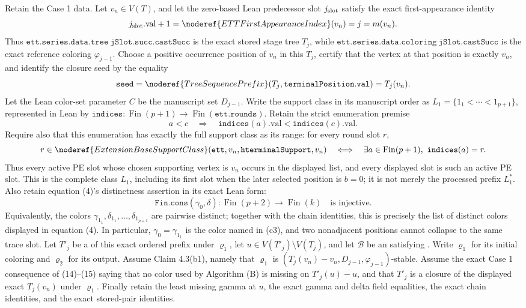 \begin{lemma}
Retain the Case 1 data.  Let \(v_n\in V(T)\), and let the zero-based Lean
predecessor slot \(j_{\rm slot}\) satisfy the exact first-appearance identity
\[
 j_{\rm slot}.\mathrm{val}+1
   =\noderef{ETTFirstAppearanceIndex}(v_n)=j=m(v_n).
\]
Thus
\(\mathtt{ett.series.data.tree\ jSlot.succ.castSucc}\) is the exact stored
stage tree \(T_j\), while
\(\mathtt{ett.series.data.coloring\ jSlot.castSucc}\) is the exact reference
coloring \(\varphi_{j-1}\).  Choose a positive occurrence position of \(v_n\)
in this \(T_j\), certify that the vertex at that position is exactly \(v_n\),
and identify the closure seed by the equality
\[
\mathtt{seed}
   =\noderef{TreeSequencePrefix}(T_j,\mathtt{terminalPosition.val})
   =T_j(v_n).
\]
Let the Lean color-set parameter \(C\) be the manuscript set \(D_{j-1}\).
Write the support class in its manuscript order as
\(L_1=\{1_1<\cdots<1_{p+1}\}\), represented in Lean by
\(\mathtt{indices}:\operatorname{Fin}(p+1)\to\operatorname{Fin}(\mathtt{ett.rounds})\).
Retain the strict enumeration premise
\[
 a<c\quad\Longrightarrow\quad
 \mathtt{indices}(a).\mathrm{val}<\mathtt{indices}(c).\mathrm{val}.
\]
Require also that this enumeration has exactly the full support class as its
range: for every round slot \(r\),
\[
 r\in\noderef{ExtensionBaseSupportClass}
       (\mathtt{ett},v_n,\mathtt{hterminalSupport},v_n)
 \quad\Longleftrightarrow\quad
 \exists a\in\operatorname{Fin}(p+1),\ \mathtt{indices}(a)=r.
\]
Thus every active PE slot whose chosen supporting vertex is \(v_n\) occurs in
the displayed list, and every displayed slot is such an active PE slot.  This
is the complete class \(L_1\), including its first slot when the later selected
position is \(b=0\); it is not merely the processed prefix \(L_1^*\).
Also retain equation (4)'s distinctness assertion in its exact Lean form:
\[
 \mathtt{Fin.cons}(\gamma_0,\delta):
   \operatorname{Fin}(p+2)\longrightarrow\operatorname{Fin}(k)
 \quad\text{is injective}.
\]
Equivalently, the colors
\(\gamma_{1_1},\delta_{1_1},\ldots,\delta_{1_{p+1}}\) are pairwise
distinct; together with the chain identities, this is precisely the list
of distinct colors displayed in equation (4).  In particular,
\(\gamma_0=\gamma_{1_1}\) is the color named in (c3), and two nonadjacent
positions cannot collapse to the same trace slot.
Let \(T'_j\) be a  of this exact ordered prefix under
\(\varrho_1\), let \(u\in V(T'_j)\setminus V(T_j)\), and let
\(\mathcal B\) be an
 satisfying
.  Write \(\varrho_1\) for
its initial coloring and \(\varrho_2\) for its output.  Assume Claim
4.3(b1), namely that \(\varrho_1\) is
\((T_j(v_n)-v_n,D_{j-1},\varphi_{j-1})\)-stable.  Assume the exact
Case 1 consequence of (14)--(15) saying that no color
used by Algorithm (B) is missing on \(T'_j(u)-u\), and that \(T'_j\) is a closure
of the displayed exact \(T_j(v_n)\) under \(\varrho_1\).  Finally retain the
least missing gamma at \(u\), the exact gamma and delta field equalities,
the exact chain identities, and the exact stored-pair identities.


\end{lemma}
